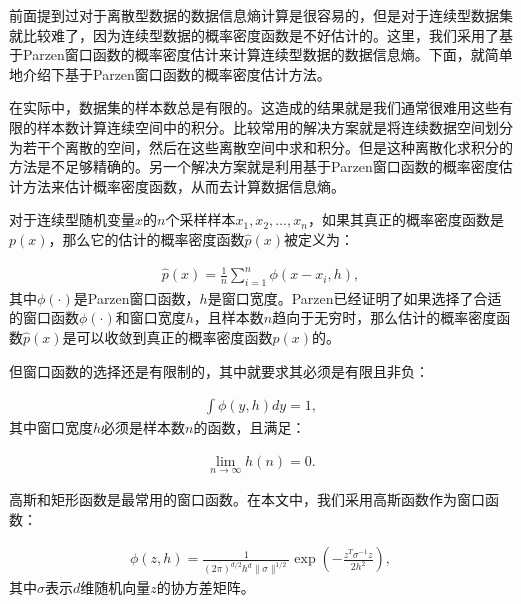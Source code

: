 前面提到过对于离散型数据的数据信息熵计算是很容易的，但是对于连续型数据集就比较难了，因为连续型数据的概率密度函数是不好估计的。这里，我们采用了基于Parzen窗口函数的概率密度估计来计算连续型数据的数据信息熵。下面，就简单地介绍下基于Parzen窗口函数的概率密度估计方法。

在实际中，数据集的样本数总是有限的。这造成的结果就是我们通常很难用这些有限的样本数计算连续空间中的积分。比较常用的解决方案就是将连续数据空间划分为若干个离散的空间，然后在这些离散空间中求和积分。但是这种离散化求积分的方法是不足够精确的。另一个解决方案就是利用基于Parzen窗口函数\cite{parzen1962estimation}的概率密度估计方法来估计概率密度函数，从而去计算数据信息熵。

对于连续型随机变量$x$的$n$个采样样本$x_1, x_2, ..., x_n$，如果其真正的概率密度函数是$p(\mathit{x})$，那么它的估计的概率密度函数$\hat{p}(\mathit{x})$被定义为：

\begin{equation}
  \begin{aligned}
    \hat{p}(x)=\frac{1}{n}\sum_{i=1}^{n}\phi(x-x_i,h),
  \end{aligned}
\end{equation}
其中$\phi(\cdot)$是Parzen窗口函数，$h$是窗口宽度。Parzen\cite{parzen1962estimation}已经证明了如果选择了合适的窗口函数$\phi(\cdot)$和窗口宽度$h$，且样本数$n$趋向于无穷时，那么估计的概率密度函数$\hat{p}(\mathit{x})$是可以收敛到真正的概率密度函数$p(\mathit{x})$的。

但窗口函数的选择还是有限制的，其中就要求其必须是有限且非负：

\begin{equation}
  \begin{aligned}
    \int \phi(y,h)dy = 1,
  \end{aligned}
\end{equation}
其中窗口宽度$h$必须是样本数$n$的函数，且满足：

\begin{equation}
  \begin{aligned}
    \lim_{n\rightarrow \infty} h(n)=0.
  \end{aligned}
\end{equation}

高斯和矩形函数是最常用的窗口函数。在本文中，我们采用高斯函数作为窗口函数：

\begin{equation}
  \begin{aligned}
    \phi(z,h)=\frac{1}{(2\pi)^{d/2}h^d\|\sigma\|^{1/2}}\exp(-\frac{z^T\sigma^{-1}z}{2h^2}),
  \end{aligned}
\end{equation}
其中$\sigma$表示$d$维随机向量$z$的协方差矩阵。

